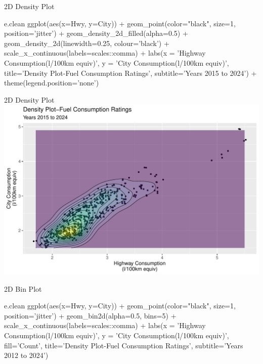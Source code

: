 \documentclass[ignorenonframetext,xcolor=x11names]{beamer}
\begin{document}
\begin{frame}[fragile]{2D Density Plot}
\footnotesize
\begin{Rcode}
e.clean %
  ggplot(aes(x=Hwy, y=City)) + 
    geom_point(color="black", size=1, 
               position='jitter') +
    geom_density_2d_filled(alpha=0.5) + 
    geom_density_2d(linewidth=0.25, colour='black') + 
    scale_x_continuous(labels=scales::comma) +
    labs(x = 'Highway Consumption\n(l/100km equiv)', 
         y = 'City Consumption\n(l/100km equiv)', 
         title='Density Plot-Fuel Consumption Ratings', 
         subtitle='Years 2015 to 2024') +
    theme(legend.position='none')
\end{Rcode}
\end{frame}

\begin{frame}{2D Density Plot}
  \includegraphics[width=\textwidth]{fuel.density2d.pdf}
\end{frame}

\begin{frame}[fragile]{2D Bin Plot}
\footnotesize
\begin{Rcode}
e.clean %
  ggplot(aes(x=Hwy, y=City)) + 
    geom_point(color="black", size=1, 
               position='jitter') +
    geom_bin2d(alpha=0.5, bins=5) + 
    scale_x_continuous(labels=scales::comma) +
    labs(x = 'Highway Consumption\n(l/100km equiv)', 
         y = 'City Consumption\n(l/100km equiv)', 
         fill='Count', 
         title='Density Plot-Fuel Consumption Ratings', 
         subtitle='Years 2012 to 2024') 
\end{Rcode}
\end{frame}
\end{document}
